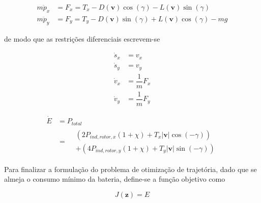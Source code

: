 \begin{equation}
\begin{aligned}
    m\ddot{p}_x &= F_x = T_x - D(\mathbf{v}) \cos(\gamma) - L(\mathbf{v}) \sin(\gamma) \\
    m\ddot{p}_y &= F_y = T_y - D(\mathbf{v}) \sin(\gamma) + L(\mathbf{v}) \cos(\gamma) - mg
\end{aligned}
\end{equation}

\noindent de modo que as restrições diferenciais escrevem-se

\begin{equation}
\begin{aligned}
    \dot{s}_x &= v_x \\
    \dot{s}_y &= v_y \\
    \dot{v}_x &= \dfrac{1}{m} F_x \\
    \dot{v}_y &= \dfrac{1}{m} F_y
\end{aligned}
\end{equation}

\begin{equation}
\begin{aligned}
    \dot{E}
    &= P_{total} \\
    &=
    \begin{aligned}
        &\left( 2 P_{ind,rotor,x} (1 + \chi) + T_x |\mathbf{v}| \cos(-\gamma) \right) \\
        &+ \left( 4 P_{ind,rotor,y} (1 + \chi) + T_y |\mathbf{v}| \sin(-\gamma) \right)
    \end{aligned}
\end{aligned}
\end{equation}

Para finalizar a formulação do problema de otimização de trajetória, dado que se almeja o consumo mínimo da bateria, define-se a função objetivo como

\begin{equation}
    J(\mathbf{z}) = E
\end{equation}

